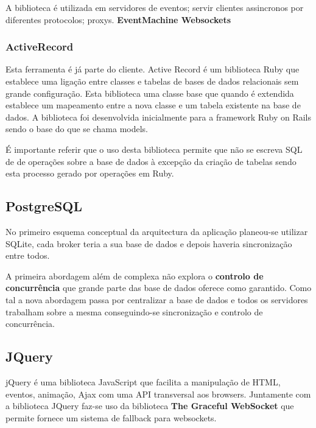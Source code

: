 A biblioteca é utilizada em servidores de eventos; servir clientes assincronos por diferentes protocolos; proxys. \textbf{EventMachine Websockets}

\subsubsection{ActiveRecord}
Esta ferramenta é já parte do cliente.
Active Record é um biblioteca Ruby que establece uma ligação entre classes e tabelas de bases de dados relacionais sem grande configuração. Esta biblioteca uma classe base que quando é extendida establece um mapeamento entre a nova classe e um tabela existente na base de dados. A biblioteca foi desenvolvida inicialmente para a framework Ruby on Rails sendo o base do que se chama models.

É importante referir que o uso desta biblioteca permite que não se escreva SQL de de operações sobre a base de dados à excepção da criação de tabelas sendo esta processo gerado por operações em Ruby.

\subsection{PostgreSQL}

No primeiro esquema conceptual da arquitectura da aplicação planeou-se utilizar SQLite, cada broker teria a sua base de dados e depois haveria sincronização entre todos. 

A primeira abordagem além de complexa não explora o \textbf{controlo de concurrência} que grande parte das base de dados oferece como garantido. Como tal a nova abordagem passa por centralizar a base de dados e todos os servidores trabalham sobre a mesma conseguindo-se sincronização e controlo de concurrência.

\subsection{JQuery}

jQuery é uma biblioteca JavaScript que facilita a manipulação de HTML, eventos, animação, Ajax com uma API transversal aos browsers. Juntamente com a biblioteca JQuery faz-se uso da biblioteca \textbf{The Graceful WebSocket} que permite fornece um sistema de fallback para websockets.

